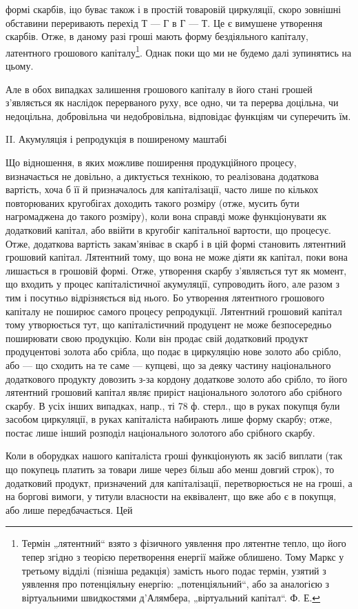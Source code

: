 \parcont{}  %
формі скарбів, іцо буває також і в простій товаровій циркуляції, скоро
зовнішні обставини переривають перехід Т — Г в Г — Т. Це є вимушене
утворення скарбів. Отже, в даному разі гроші мають форму бездіяльного
капіталу, латентного грошового капіталу\footnote{
Термін „лятентний“ взято з фізичного уявлення про лятентне тепло, що
його тепер згідно з теорією перетворення енергії майже облишено. Тому Маркс
у третьому відділі (пізніша редакція) замість нього подає термін, узятий з уявлення
про потенціяльну енергію: „потенціяльний“, або за аналогією з віртуальними швидкостями
д’Алямбера, „віртуальний капітал“. Ф. Е.
}. Однак поки що ми не будемо
далі зупинятись на цьому.

Але в обох випадках залишення грошового капіталу в його стані
грошей з’являється як наслідок перерваного руху, все одно, чи та перерва
доцільна, чи недоцільна, добровільна чи недобровільна, відповідає функціям
чи суперечить їм.

II. Акумуляція і репродукція в поширеному маштабі

Що відношення, в яких можливе поширення продукційного процесу,
визначається не довільно, а диктується технікою, то реалізована додаткова
вартість, хоча б її й призначалось для капіталізації, часто лише по
кількох повторюваних кругобігах доходить такого розміру (отже, мусить
бути нагромаджена до такого розміру), коли вона справді може функціонувати
як додатковий капітал, або ввійти в кругобіг капітальної вартости,
що процесує. Отже, додаткова вартість закам’яніває в скарб і в цій
формі становить лятентний грошовий капітал. Лятентний тому, що вона не
може діяти як капітал, поки вона лишається в грошовій формі. Отже,
утворення скарбу з’являється тут як момент, що входить у процес капіталістичної
акумуляції, супроводить його, але разом з тим і посутньо
відрізняється від нього. Бо утворення лятентного грошового капіталу
не поширює самого процесу репродукції. Лятентний грошовий
капітал тому утворюється тут, що капіталістичний продуцент не може
безпосередньо поширювати свою продукцію. Коли він продає свій додатковий
продукт продуцентові золота або срібла, що подає в циркуляцію
нове золото або срібло, або — що сходить на те саме — купцеві, що
за деяку частину національного додаткового продукту довозить
з-за кордону додаткове золото або срібло, то його лятентний грошовий
капітал являє приріст національного золотого або срібного скарбу. В усіх
інших випадках, напр., ті 78 ф. стерл., що в руках покупця були засобом
циркуляції, в руках капіталіста набирають лише форму скарбу;
отже, постає лише інший розподіл національного золотого або срібного
скарбу.

Коли в оборудках нашого капіталіста гроші функціонують як засіб виплати
(так що покупець платить за товари лише через більш або менш довгий
строк), то додатковий продукт, призначений для капіталізації, перетворюється
не на гроші, а на боргові вимоги, у титули власности
на еквівалент, що вже або є в покупця, або лише передбачається. Цей
\parbreak{}  %
